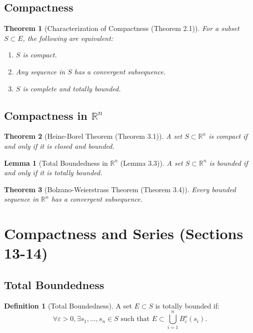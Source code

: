 \documentclass[9pt]{article}
\theoremstyle{definition}
\newtheorem{definition}{Definition}
\theoremstyle{plain}
\newtheorem{theorem}{Theorem}
\newtheorem{lemma}{Lemma}
\begin{document}
\subsection*{Compactness}
\begin{theorem}[Characterization of Compactness (Theorem 2.1)]
For a subset \( S \subset E \), the following are equivalent:
\begin{enumerate}
    \item \( S \) is compact.
    \item Any sequence in \( S \) has a convergent subsequence.
    \item \( S \) is complete and totally bounded.
\end{enumerate}
\end{theorem}

\subsection*{Compactness in \( \mathbb{R}^n \)}
\begin{theorem}[Heine-Borel Theorem (Theorem 3.1)]
A set \( S \subset \mathbb{R}^n \) is compact if and only if it is closed and bounded.
\end{theorem}

\begin{lemma}[Total Boundedness in \( \mathbb{R}^n \) (Lemma 3.3)]
A set \( S \subset \mathbb{R}^n \) is bounded if and only if it is totally bounded.
\end{lemma}

\begin{theorem}[Bolzano-Weierstrass Theorem (Theorem 3.4)]
Every bounded sequence in \( \mathbb{R}^n \) has a convergent subsequence.
\end{theorem}
\section*{Compactness and Series (Sections 13-14)}

\subsection*{Total Boundedness}
\begin{definition}[Total Boundedness]
A set \( E \subset S \) is totally bounded if:
\[
\forall \varepsilon > 0, \exists s_1, \ldots, s_n \in S \text{ such that } E \subset \bigcup_{i=1}^n B_\varepsilon^o(s_i).
\]
\end{definition}
\end{document}
